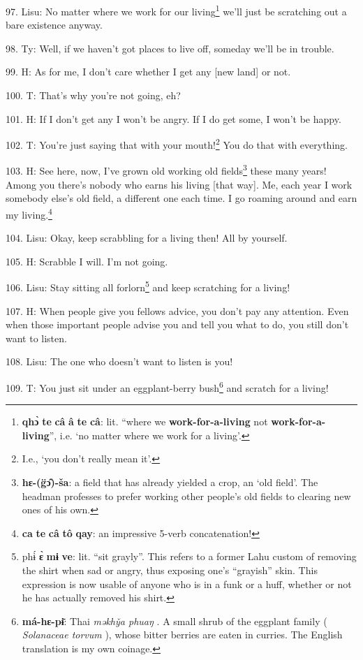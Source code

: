 97. Lisu: No matter where we work for our living\footnote{\textbf{qhɔ̀} \textbf{te} \textbf{câ} \textbf{â} \textbf{te} \textbf{câ}: lit. ``where we \textbf{work-for-a-living} not \textbf{work-for-a-living}'', i.e. `no matter where we work for a living'.} we'll just be scratching out
a bare existence anyway.

98. Ty: Well, if we haven't got places to live off, someday we'll be in trouble.

99. H: As for me, I don't care whether I get any [new land] or not.

100. T: That's why you're not going, eh?

101. H: If I don't get any I won't be angry. If I do get some, I won't be happy.

102. T: You're just saying that with your mouth!\footnote{I.e., `you don't really mean it'.} You do that with everything.

103. H: See here, now, I've grown old working old fields\footnote{\textbf{hɛ-(g̈ɔ̂)-ša}: a field that has already yielded a crop, an `old field'. The headman professes to prefer working other people's old fields to clearing new ones of his own.} these many years! Among
you there's nobody who earns his living [that way]. Me, each year I work somebody
else's old field, a different one each time. I go roaming around and earn my living.\footnote{\textbf{ca} \textbf{te} \textbf{câ} \textbf{tô} \textbf{qay}: an impressive 5-verb concatenation!}

104. Lisu: Okay, keep scrabbling for a living then! All by yourself.

105. H: Scrabble I will. I'm not going.

106. Lisu: Stay sitting all forlorn\footnote{phɨ́ \textbf{ɛ̀} \textbf{mɨ} \textbf{ve}: lit. ``sit grayly''. This refers to a former Lahu custom of removing the shirt when sad or angry, thus exposing one's ``grayish'' skin. This expression is now usable of anyone who is in a funk or a huff, whether or not he has actually removed his shirt.} and keep scratching for a living!

107. H: When people give you fellows advice, you don't pay any attention. Even when
those important people advise you and tell you what to do, you still don't want
to listen.

108. Lisu: The one who doesn't want to listen is you!

109. T: You just sit under an eggplant-berry bush\footnote{\textbf{má-hɛ-pɨ̄}: Thai \textit{məkhy̌a phuaŋ }. A small shrub of the eggplant family ( \textit{Solanaceae torvum }), whose bitter berries are eaten in curries. The English translation is my own coinage.} and scratch for a living!

